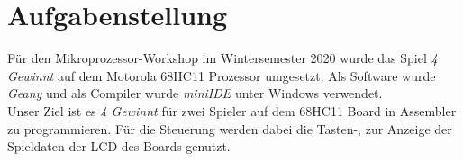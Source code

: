 \section{Aufgabenstellung}
    Für den Mikroprozessor-Workshop im Wintersemester 2020 wurde das Spiel \textit{4 Gewinnt} auf dem Motorola 68HC11 Prozessor umgesetzt.
    Als Software wurde \textit{Geany} und als Compiler wurde \textit{miniIDE} unter Windows verwendet.
    \\
    Unser Ziel ist es \textit{4 Gewinnt} für zwei Spieler auf dem 68HC11 Board in Assembler zu programmieren.
    Für die Steuerung werden dabei die Tasten-, zur Anzeige der Spieldaten der LCD des Boards genutzt.